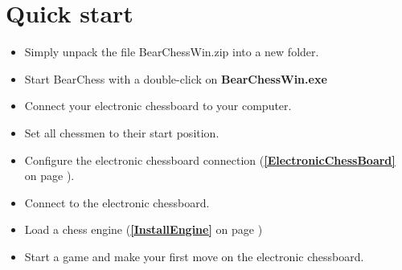 \documentclass[11pt,a4paper]{article}
\begin{document}
\section{Quick start}
\begin{itemize}
	\item Simply unpack the file BearChessWin.zip into a new folder.
	\item Start BearChess with a double-click on \textbf{BearChessWin.exe}
	\item Connect your electronic chessboard to your computer.
	\item Set all chessmen to their start position.
	\item Configure the electronic chessboard connection (\textbf{\ref{ElectronicChessBoard}  } on page \pageref{ElectronicChessBoard}).
	\item Connect to the electronic chessboard.
	\item Load a chess engine (\textbf{\ref{InstallEngine}  } on page \pageref{InstallEngine})
	\item Start a game and make your first move on the electronic chessboard.
\end{itemize}
\end{document}
